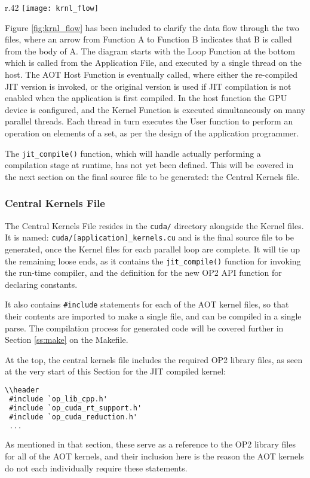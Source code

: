 \begin{wrapfigure}{r}{.42\textwidth}
  \centering
  \texttt{[image: krnl\_flow]}
  \caption{Kernel Flow}
  \label{fig:krnl_flow}
\end{wrapfigure}

Figure \ref{fig:krnl_flow} has been included to clarify the data flow through the two files, where an arrow from Function A to Function B indicates that B is called from the body of A. The diagram starts with the Loop Function at the bottom which is called from the Application File, and executed by a single thread on the host. The AOT Host Function is eventually called, where either the re-compiled JIT version is invoked, or the original version is used if JIT compilation is not enabled when the application is first compiled. In the host function the GPU device is configured, and the Kernel Function is executed simultaneously on many parallel threads. Each thread in turn executes the User function to perform an operation on elements of a set, as per the design of the application programmer.

The \verb|jit_compile()| function, which will handle actually performing a compilation stage at runtime, has not yet been defined. This will be covered in the next section on the final source file to be generated: the Central Kernels file.
\clearpage
\subsubsection{Central Kernels File}
\label{sss:mkf}
The Central Kernels File resides in the \verb|cuda/| directory alongside the Kernel files. It is named: \verb|cuda/[application]_kernels.cu| and is the final source file to be generated, once the Kernel files for each parallel loop are complete. It will tie up the remaining loose ends, as it contains the \verb|jit_compile()| function for invoking the run-time compiler, and the definition for the new OP2 API function for declaring constants.
\par It also contains \verb|#include| statements for each of the AOT kernel files, so that their contents are imported to make a single file, and can be compiled in a single parse. The compilation process for generated code will be covered further in Section \ref{ss:make} on the Makefile.
\par
At the top, the central kernels file includes the required OP2 library files, as seen at the very start of this Section for the JIT compiled kernel:
\begin{lstlisting}[backgroundcolor = \color{red!20}, language=C]
\\header
 #include `op_lib_cpp.h'
 #include `op_cuda_rt_support.h'
 #include `op_cuda_reduction.h'
 ...
\end{lstlisting}
As mentioned in that section, these serve as a reference to the OP2 library files for all of the AOT kernels, and their inclusion here is the reason the AOT kernels do not each individually require these statements.

